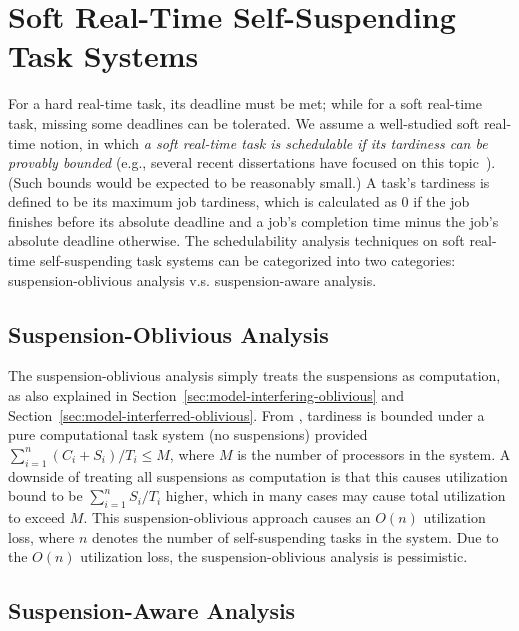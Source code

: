 \section{Soft Real-Time Self-Suspending Task Systems}
\label{sec:soft-realtime}

For a hard real-time task, its deadline must be met; while for a soft real-time task, missing some deadlines can be tolerated. We assume a well-studied soft real-time notion, in which \emph{a soft real-time task is schedulable if its tardiness can be provably bounded} (e.g., several recent dissertations have focused on this topic~\cite{leontyev2010compositional, devi2006soft}). (Such bounds would be expected to be reasonably small.) A task's tardiness is defined to be its maximum job tardiness, which is calculated as $0$ if the job finishes before its absolute deadline and a job's completion time minus the job's absolute deadline otherwise.
The schedulability analysis techniques on soft real-time self-suspending task systems can be categorized into two categories: suspension-oblivious analysis v.s. suspension-aware analysis.

\subsection{Suspension-Oblivious Analysis}
\label{sec:sus-oblivious-soft}

 The suspension-oblivious analysis simply treats the suspensions as computation, as also explained in Section~\ref{sec:model-interfering-oblivious} and Section~\ref{sec:model-interferred-oblivious}. From \cite{Devi2005,Leontyev072}, tardiness is bounded under a pure computational task system (no suspensions) provided $\sum_{i=1}^{n} (C_i+S_i)/T_i \leq M$, where $M$ is the number of processors in the system. A downside of treating all suspensions as computation is that this causes utilization bound to be $\sum_{i=1}^{n} S_i/T_i$ higher, which in many cases may cause total utilization to exceed $M$.  This suspension-oblivious approach causes an $O(n)$ utilization loss, where $n$ denotes the number of self-suspending tasks in the system. 
 Due to the $O(n)$ utilization loss, the suspension-oblivious analysis is pessimistic. 

\subsection{Suspension-Aware Analysis}
\label{sec:sus-aware-soft}

